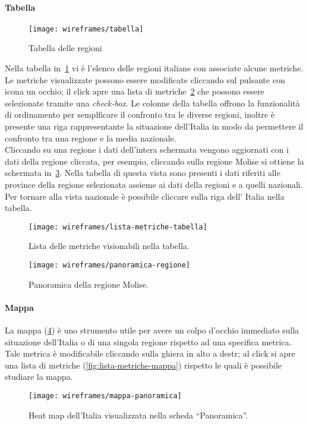 \paragraph{Tabella}
\begin{figure}[H]
    \centering
    \texttt{[image: wireframes/tabella]}
    \caption{Tabella delle regioni}
    \label{fig:tabella}
\end{figure}
Nella tabella in~\ref{fig:tabella} vi è l'elenco delle regioni italiane con associate alcune metriche. Le metriche visualizzate possono essere modificate cliccando sul pulsante con icona un occhio; il click apre una lista di metriche~\ref{fig:lista-metriche-tabella} che possono essere selezionate tramite una \textit{check-box}. Le colonne della tabella offrono la funzionalità di ordinamento per semplficare il confronto tra le diverse regioni, inoltre è presente una riga rappresentante la situazione dell'Italia in modo da permettere il confronto tra una regione e la media nazionale.\\
Cliccando su una regione i dati dell'intera schermata vengono aggiornati con i dati della regione cliccata, per esempio, cliccando sulla regione Molise si ottiene la schermata in~\ref{fig:panoramica-regione}. Nella tabella di questa vista sono presenti i dati riferiti alle province della regione selezionata assieme ai dati della regioni e a quelli nazionali. Per tornare alla vista nazionale è possibile cliccare sulla riga dell' Italia nella tabella.
\begin{figure}[H]
    \centering
    \texttt{[image: wireframes/lista-metriche-tabella]}
    \caption{Lista delle metriche visionabili nella tabella.}
    \label{fig:lista-metriche-tabella}
\end{figure}

\begin{figure}[H]
    \centering
    \texttt{[image: wireframes/panoramica-regione]}
    \caption{Panoramica della regione Molise.}
    \label{fig:panoramica-regione}
\end{figure}

\paragraph{Mappa}
La mappa (\ref{fig:mappa-panoramica}) è uno strumento utile per avere un colpo d'occhio immediato sulla situazione dell'Italia o di una singola regione rispetto ad una specifica metrica. Tale metrica è modificabile cliccando sulla ghiera in alto a destr; al click si apre una lista di metriche (\ref{fig:lista-metriche-mappa}) rispetto le quali è possibile studiare la mappa.
\begin{figure}[H]
    \centering
    \texttt{[image: wireframes/mappa-panoramica]}
    \caption{Heat map dell'Italia visualizzata nella scheda ``Panoramica''.}
    \label{fig:mappa-panoramica}
\end{figure}

